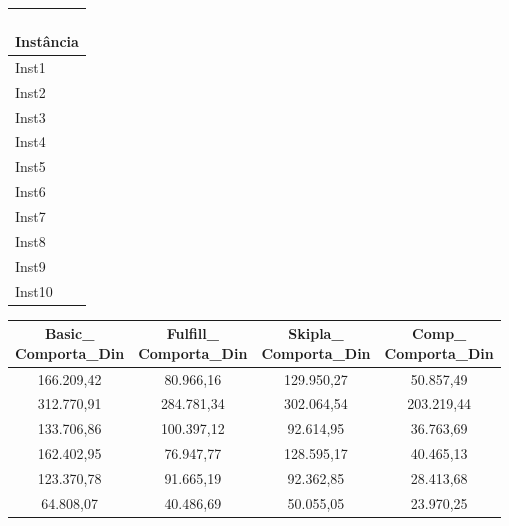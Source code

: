\begin{table}[H]
	\centering
	\setlength{\tabcolsep}{4pt}
	\scriptsize
	\begin{subtable}[t]{0.10\textwidth}
		\centering
		\begin{tabular}{@{}l@{}}
			\toprule
			\makecell[l]{\textbf{ } \\\textbf{Instância}}  \\
			\midrule
			Inst1                   \\
			Inst2                   \\
			Inst3                   \\
			Inst4                   \\
			Inst5                   \\
			Inst6                   \\
			Inst7                   \\
			Inst8                   \\
			Inst9                   \\
			Inst10                  \\
			\bottomrule
		\end{tabular}
	\end{subtable}
	\hfill
	\begin{subtable}[t]{0.49\textwidth}
		\centering
		\begin{tabular}{@{}cccc@{}}
			\toprule
			\makecell[c]{\textbf{Basic\_}                                          \\\textbf{Comporta\_Din}}
			           & \makecell[c]{\textbf{Fulfill\_}                           \\\textbf{Comporta\_Din}}
			           & \makecell[c]{\textbf{Skipla\_}                            \\\textbf{Comporta\_Din}}
			           & \makecell[c]{\textbf{Comp\_}                              \\\textbf{Comporta\_Din}} \\
			\midrule
			166.209,42 & 80.966,16  & 129.950,27 & 50.857,49  \\
			312.770,91 & 284.781,34 & 302.064,54 & 203.219,44 \\
			133.706,86 & 100.397,12 & 92.614,95  & 36.763,69  \\
			162.402,95 & 76.947,77  & 128.595,17 & 40.465,13  \\
			123.370,78 & 91.665,19  & 92.362,85  & 28.413,68  \\
			64.808,07  & 40.486,69  & 50.055,05  & 23.970,25  \\

\end{tabular}
\end{subtable}
\end{table}
